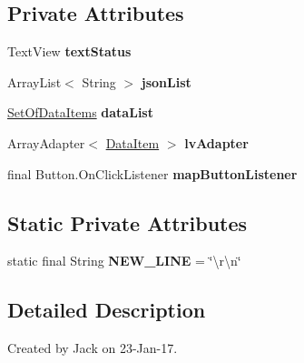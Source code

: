 \subsection*{Private Attributes}
\begin{DoxyCompactItemize}
\item 
\mbox{\label{classcom_1_1jack_1_1motorbikestatistics_1_1_realtime_fragment_a934eb88d5412c4a06635e8b2dcdde397}} 
Text\+View {\bfseries text\+Status}
\item 
\mbox{\label{classcom_1_1jack_1_1motorbikestatistics_1_1_realtime_fragment_aeaf4c36f29c56ec961bda017de9cc671}} 
Array\+List$<$ String $>$ {\bfseries json\+List}
\item 
\mbox{\label{classcom_1_1jack_1_1motorbikestatistics_1_1_realtime_fragment_adde56e8b4f0e954a9a1167e50fb80420}} 
\hyperlink{classcom_1_1jack_1_1motorbikestatistics_1_1_set_of_data_items}{Set\+Of\+Data\+Items} {\bfseries data\+List}
\item 
\mbox{\label{classcom_1_1jack_1_1motorbikestatistics_1_1_realtime_fragment_ae5e621d6d5f22ddb72ace3ca227f3760}} 
Array\+Adapter$<$ \hyperlink{classcom_1_1jack_1_1motorbikestatistics_1_1_data_item}{Data\+Item} $>$ {\bfseries lv\+Adapter}
\item 
final Button.\+On\+Click\+Listener {\bfseries map\+Button\+Listener}
\end{DoxyCompactItemize}
\subsection*{Static Private Attributes}
\begin{DoxyCompactItemize}
\item 
\mbox{\label{classcom_1_1jack_1_1motorbikestatistics_1_1_realtime_fragment_a6a531a688878f758b89c7f30d0798d07}} 
static final String {\bfseries N\+E\+W\+\_\+\+L\+I\+NE} = \char`\"{}\textbackslash{}r\textbackslash{}n\char`\"{}
\end{DoxyCompactItemize}


\subsection{Detailed Description}
Created by Jack on 23-\/\+Jan-\/17. 

